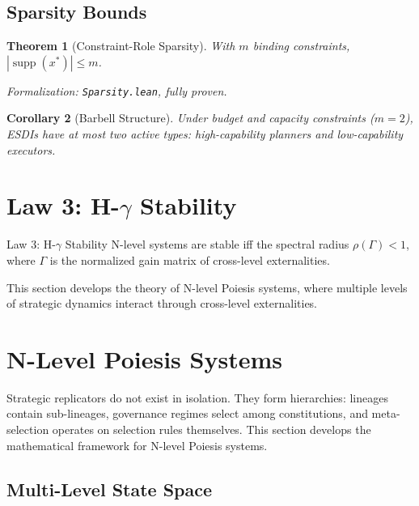 \documentclass[12pt]{article}
\newtheorem{theorem}{Theorem}[section]
\newtheorem{corollary}[theorem]{Corollary}
\DeclareMathOperator{\supp}{supp}
\begin{document}
\subsection{Sparsity Bounds}

\begin{theorem}[Constraint-Role Sparsity]
\label{thm:sparsity}
With $m$ binding constraints, $|\supp(x^*)| \leq m$.
\end{theorem}
\noindent\textit{Formalization: \texttt{Sparsity.lean}, fully proven.}

\begin{corollary}[Barbell Structure]
Under budget and capacity constraints ($m = 2$), ESDIs have at most two active types: high-capability planners and low-capability executors.
\end{corollary}



\section{Law 3: H-$\gamma$ Stability}
\label{sec:law3}

\begin{lawbox}{Law 3: H-$\gamma$ Stability}
N-level systems are stable iff the spectral radius $\rho(\Gamma) < 1$, where $\Gamma$ is the normalized gain matrix of cross-level externalities.
\end{lawbox}

This section develops the theory of N-level Poiesis systems, where multiple levels of strategic dynamics interact through cross-level externalities.

\section{N-Level Poiesis Systems}
\label{sec:n-level}

Strategic replicators do not exist in isolation. They form hierarchies: lineages contain sub-lineages, governance regimes select among constitutions, and meta-selection operates on selection rules themselves. This section develops the mathematical framework for N-level Poiesis systems.

\subsection{Multi-Level State Space}
\end{document}
